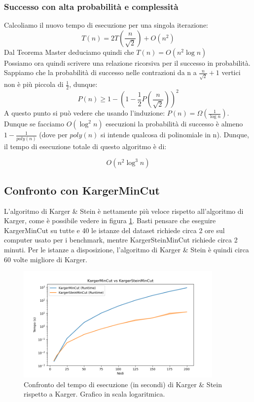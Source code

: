 \subsubsection{Successo con alta probabilità e complessità}
\label{sub:karger-stein-success-whp}

Calcoliamo il nuovo tempo di esecuzione per una singola iterazione:
$$T(n) = 2T \left( \dfrac{n}{\sqrt{2}} \right) + O(n^2) $$
Dal Teorema Master deduciamo quindi che $T(n) = O(n^2 \log{n})$\\

\noindent Possiamo ora quindi scrivere una relazione ricorsiva per il successo in probabilità. Sappiamo che la probabilità di successo nelle contrazioni da n a $\frac{n}{\sqrt{2}} + 1$ vertici non è più piccola di $\frac{1}{2}$, dunque:
$$P(n) \geq 1- \left( 1- \frac{1}{2} P \left(\dfrac{n}{\sqrt{2}} \right) \right)^2$$
A questo punto si può vedere che usando l'induzione: $P(n)= \Omega(\frac{1}{\log{n}}) $. Dunque se facciamo $O(\log^2{n})$ esecuzioni la probabilità di successo è almeno $1-\frac{1}{poly(n)}$ (dove per $poly(n)$ si intende qualcosa di polinomiale in n). Dunque, il tempo di esecuzione totale di questo algoritmo è di:

$$O(n^2 \log^3{n})$$

\subsection{Confronto con KargerMinCut}

\noindent L'algoritmo di Karger \& Stein è nettamente più veloce rispetto all'algoritmo di Karger, come è possibile vedere in figura \ref{fig:karger-vs-karger-stein}. Basti pensare che eseguire KargerMinCut su tutte e 40 le istanze del dataset richiede circa 2 ore sul computer usato per i benchmark, mentre KargerSteinMinCut richiede circa 2 minuti. Per le istanze a disposizione, l'algoritmo di Karger \& Stein è quindi circa 60 volte migliore di Karger.

\begin{figure}[H]
    \centering

    \includegraphics[width=0.9\textwidth]{./images/karger_vs_karger_stein - log.png}

    \caption{Confronto del tempo di esecuzione (in secondi) di Karger \& Stein rispetto a Karger. Grafico in scala logaritmica.}
    \label{fig:karger-vs-karger-stein}
\end{figure}

